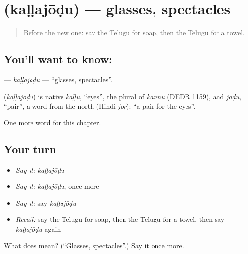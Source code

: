 \section[\texorpdfstring{\te{కళ్ళజోడు} (kaḷḷajōḍu)}{కళ్ళజోడు (kaḷḷajōḍu)}]{ (kaḷḷajōḍu) — glasses, spectacles}

\label{lesson:TE-C111-kallajodu}



\begin{quote}
Before the new one: say the Telugu for soap, then the Telugu for a towel.
\end{quote}

\subsection*{You'll want to know: }
\textbf{} — \emph{kaḷḷajōḍu} — \textquotedblleft{}glasses, spectacles\textquotedblright{}.

\begin{cousinweb}
\textbf{} (\emph{kaḷḷajōḍu}) is native \emph{kaḷḷu}, \textquotedblleft{}eyes\textquotedblright{}, the plural of \emph{kannu} (DEDR 1159), and \emph{jōḍu}, \textquotedblleft{}pair\textquotedblright{}, a word from the north (Hindi \emph{joṛ}): \textquotedblleft{}a pair for the eyes\textquotedblright{}.
\end{cousinweb}

\begin{grammarlens}[title={What you've built}]
One more word for this chapter.
\end{grammarlens}

\subsection*{Your turn}
\begin{itemize}
\raggedright
  \item \emph{Say it:} \emph{kaḷḷajōḍu}
  \item \emph{Say it:} \emph{kaḷḷajōḍu}, once more
  \item \emph{Say it:} say \emph{kaḷḷajōḍu}
  \item \emph{Recall:} say the Telugu for soap, then the Telugu for a towel, then say \emph{kaḷḷajōḍu} again
\end{itemize}

\begin{tcolorbox}[breakable,colback=teal!4,colframe=teal!35!black,title={Before you move on}]
What does  mean? (\textquotedblleft{}Glasses, spectacles\textquotedblright{}.) Say it once more.
\end{tcolorbox}
